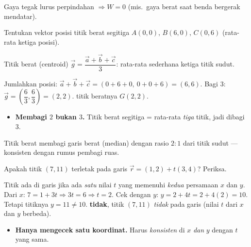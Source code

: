 \begin{variasi}
Gaya tegak lurus perpindahan $\Rightarrow W=0$ (mis.\ gaya berat saat benda
bergerak mendatar).
\end{variasi}

\begin{soalbox}{}
Tentukan vektor posisi titik berat segitiga $A(0,0)$, $B(6,0)$, $C(0,6)$
(rata-rata ketiga posisi).
\end{soalbox}

\begin{ingat}{Titik berat (centroid)}
$\vec g=\dfrac{\vec a+\vec b+\vec c}{3}$: rata-rata sederhana ketiga titik sudut.
\end{ingat}

\jawab
{} Jumlahkan posisi: $\vec a+\vec b+\vec c=(0+6+0,\ 0+0+6)=(6,6)$.
 Bagi $3$: $\vec g=\left(\dfrac63,\dfrac63\right)=(2,2)$.
\jadi titik beratnya $G(2,2)$.

\begin{jebakan}
\begin{itemize}[leftmargin=*,topsep=2pt]
  \item \textbf{Membagi $2$ bukan $3$.} Titik berat segitiga = rata-rata
  \emph{tiga} titik, jadi dibagi $3$.
\end{itemize}
\end{jebakan}

\begin{variasi}
Titik berat membagi garis berat (median) dengan rasio $2:1$ dari titik sudut ---
konsisten dengan rumus pembagi ruas.
\end{variasi}

\begin{soalbox}{}
Apakah titik $(7,11)$ terletak pada garis $\vec r=(1,2)+t(3,4)$? Periksa.
\end{soalbox}

\jawab
{} Titik ada di garis jika ada \emph{satu} nilai $t$ yang memenuhi
\emph{kedua} persamaan $x$ dan $y$.
 Dari $x$: $7=1+3t\Rightarrow 3t=6\Rightarrow t=2$.
 Cek dengan $y$: $y=2+4t=2+4(2)=10$. Tetapi titiknya $y=11\neq10$.
\jadi \textbf{tidak}, titik $(7,11)$ \emph{tidak} pada garis (nilai $t$ dari $x$
dan $y$ berbeda).

\begin{jebakan}
\begin{itemize}[leftmargin=*,topsep=2pt]
  \item \textbf{Hanya mengecek satu koordinat.} Harus \emph{konsisten} di $x$
  \emph{dan} $y$ dengan $t$ yang sama.
\end{itemize}
\end{jebakan}

